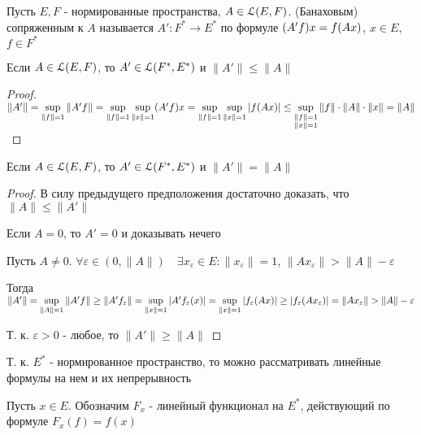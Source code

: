 \documentclass[a4paper,12pt]{report}
\newcommand*{\hm}[1]{#1\nobreak\discretionary{}%
            {\hbox{$\mathsurround=0pt #1$}}{}}
\begin{document}
\begin{df}
Пусть $E,F$ - нормированные пространства, $A\in\EuScript L(E,F)$. (Банаховым) сопряженным к $A$ называется $A'\colon F^*\to E^*$ по формуле $(A'f)x\hm=f(Ax)$, $x\in E$, $f\in F^*$
\end{df}
 


\begin{prop}
Если $A\in\EuScript L(E,F)$, то $A'\in\EuScript L(F^*,E^*)$ и $\|A'\|\le\|A\|$
\end{prop}
\begin{proof}
$\|A'\|=\sup\limits_{\|f\|=1}\|A'f\|=\sup\limits_{\|f\|=1}\sup\limits_{\|x\|=1}(A'f)x=\sup\limits_{\|f\|=1}\sup\limits_{\|x\|=1}|f(Ax)|\hm\le\sup\limits_{\substack{\|f\|=1\\ \|x\|=1}}\|f\|\cdot\|A\|\cdot\|x\|=\|A\|$
\end{proof}
 


\begin{thm}
Если $A\in\EuScript L(E,F)$, то $A'\in\EuScript L(F^*,E^*)$ и $\|A'\|=\|A\|$
\end{thm}
\begin{proof}
В силу предыдущего предположения достаточно доказать, что $\|A\|\le\|A'\|$

Если $A=0$, то $A'=0$ и доказывать нечего

Пусть $A\ne0$. $\forall\varepsilon\in(0,\|A\|)\quad\exists x_\varepsilon\in E\colon\|x_\varepsilon\|=1$, $\|Ax_\varepsilon\|>\|A\|-\varepsilon$

Тогда $\|A'\|=\sup\limits_{\|A\|=1}\|A'f\|\ge\|A'f_\varepsilon\|=\sup\limits_{\|x\|=1}|A'f_\varepsilon(x)|=\sup\limits_{\|x\|=1}|f_\varepsilon(Ax)|\hm\ge|f_\varepsilon(Ax_\varepsilon)|=\|Ax_\varepsilon\|>\|A\|-\varepsilon$

Т. к. $\varepsilon>0$ - любое, то $\|A'\|\ge\|A\|$
\end{proof}
 

\noindent Т. к. $E^*$ - нормированное пространство, то можно рассматривать линейные формулы на нем и их непрерывность
 

\begin{df}
Пусть $x\in E$. Обозначим $F_x$ - линейный функционал на $E^*$, действующий по формуле $F_x(f)=f(x)$
\end{df}
 
\end{document}
